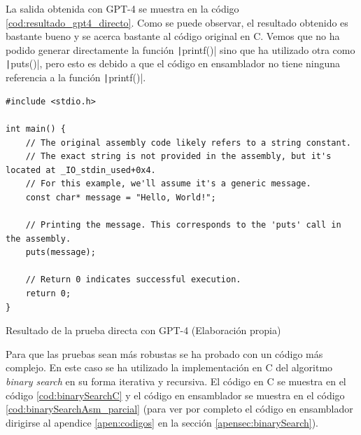 La salida obtenida con GPT-4 se muestra en la código \ref{cod:resultado_gpt4_directo}. Como se puede
observar, el resultado obtenido es bastante bueno y se acerca bastante al código original en C. Vemos
que no ha podido generar directamente la función \texttt|printf()| sino que ha utilizado
otra como \texttt|puts()|, pero esto es debido a que el código en ensamblador no tiene
ninguna referencia a la función \texttt|printf()|.

\begin{mycode}
    \begin{verbatim}
#include <stdio.h>

int main() {
    // The original assembly code likely refers to a string constant.
    // The exact string is not provided in the assembly, but it's located at _IO_stdin_used+0x4.
    // For this example, we'll assume it's a generic message.
    const char* message = "Hello, World!";

    // Printing the message. This corresponds to the 'puts' call in the assembly.
    puts(message);

    // Return 0 indicates successful execution.
    return 0;
}
    \end{verbatim}
    \caption[Resultado de la prueba directa con GPT-4]{Resultado de la prueba directa con GPT-4 (Elaboración propia)}
    \label{cod:resultado_gpt4_directo}
\end{mycode}

Para que las pruebas sean más robustas se ha probado con un código más complejo.
En este caso se ha utilizado la implementación en C del algoritmo \textit{binary search} en
su forma iterativa y recursiva. El código en C se muestra en el código \ref{cod:binarySearchC}
y el código en ensamblador se muestra en el código \ref{cod:binarySearchAsm_parcial} (para ver
por completo el código en ensamblador dirigirse al apendice \ref{apen:codigos} en la sección
\ref{apensec:binarySearch}).

